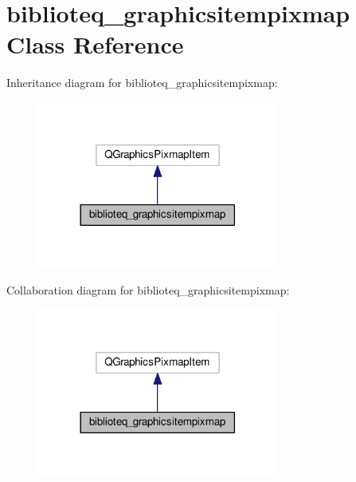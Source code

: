 \hypertarget{classbiblioteq__graphicsitempixmap}{}\section{biblioteq\+\_\+graphicsitempixmap Class Reference}
\label{classbiblioteq__graphicsitempixmap}


Inheritance diagram for biblioteq\+\_\+graphicsitempixmap\+:
\nopagebreak
\begin{figure}[H]
\begin{center}
\leavevmode
\includegraphics[width=225pt]{classbiblioteq__graphicsitempixmap__inherit__graph}
\end{center}
\end{figure}


Collaboration diagram for biblioteq\+\_\+graphicsitempixmap\+:
\nopagebreak
\begin{figure}[H]
\begin{center}
\leavevmode
\includegraphics[width=225pt]{classbiblioteq__graphicsitempixmap__coll__graph}
\end{center}
\end{figure}
